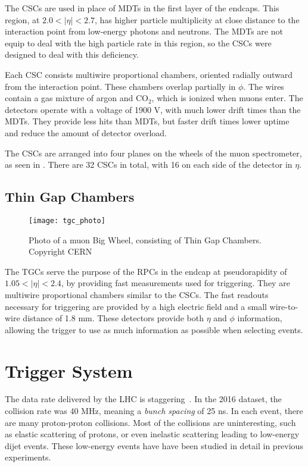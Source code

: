 The CSCs are used in place of MDTs in the first layer of the endcaps.
This region, at $2.0 < |\eta| < 2.7$, has higher particle multiplicity at close distance to the interaction point from low-energy photons and neutrons.
The MDTs are not equip to deal with the high particle rate in this region, so the CSCs were designed to deal with this deficiency.

Each CSC consists multiwire proportional chambers, oriented radially outward from the interaction point.
These chambers overlap partially in $\phi$.
The wires contain a gas mixture of argon and CO$_2$, which is ionized when muons enter.
The detectors operate with a voltage of 1900 V, with much lower drift times than the MDTs.
They provide less hits than MDTs, but faster drift times lower uptime and reduce the amount of detector overload.

The CSCs are arranged into four planes on the wheels of the muon spectrometer, as seen in .
There are 32 CSCs in total, with 16 on each side of the detector in $\eta.$

\subsection{Thin Gap Chambers}
\begin{figure}[tbp]
\caption{Photo of a muon Big Wheel, consisting of Thin Gap Chambers. Copyright CERN} \label{fig:tgc_photo}
\texttt{[image: tgc\_photo]}
\end{figure}

The TGCs serve the purpose of the RPCs in the endcap at pseudorapidity of $1.05 < |\eta| < 2.4 $, by providing fast measurements used for triggering.
They are multiwire proportional chambers similar to the CSCs.
The fast readouts necessary for triggering are provided by a high electric field and a small wire-to-wire distance of 1.8 mm.
These detectors provide both $\eta$ and $\phi$ information, allowing the trigger to use as much information as possible when selecting events.

\section{Trigger System}\label{sec:trigger}

The data rate delivered by the LHC is staggering~\cite{ATL-DAQ-PUB-2016-001}.
In the 2016 dataset, the collision rate was 40 MHz, meaning a \textit{bunch spacing} of 25 ns.
In each event, there are many proton-proton collisions.
Most of the collisions are uninteresting, such as elastic scattering of protons, or even inelastic scattering leading to low-energy dijet events.
These low-energy events have have been studied in detail in previous experiments.


